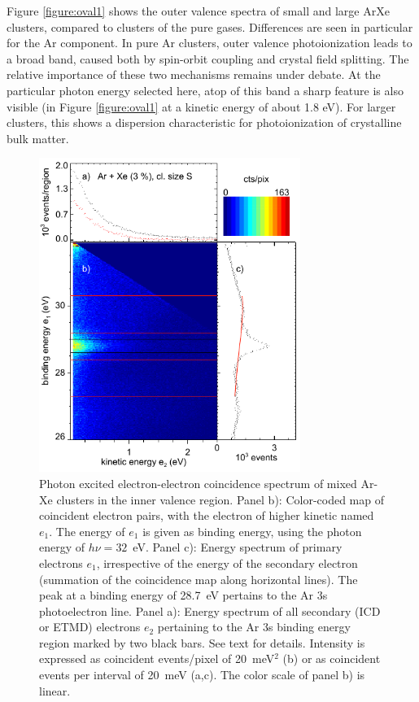 Figure \ref{figure:oval1} shows the outer valence spectra of small and large ArXe clusters, compared to clusters of the pure gases. Differences are seen in particular for the Ar component. In pure Ar clusters, outer valence photoionization leads to a broad band, caused both by spin-orbit coupling and crystal field splitting. The relative importance of these two mechanisms remains under debate.\cite{hergenhahnprb,rolles} At the particular photon energy selected here, atop of this band a sharp feature is also visible (in Figure \ref{figure:oval1} at a kinetic energy of about 1.8 eV). For larger clusters, this shows a dispersion characteristic for photoionization of crystalline bulk matter.\cite{foerstel_arg1_2010,foerstel_arg2_2011} 



\begin{figure}[ht]
 \centering
 \includegraphics[width=8.5cm]{pics/figure_map.pdf}
 \caption{
Photon excited electron-electron coincidence spectrum of mixed Ar-Xe clusters in the inner valence region. Panel b): Color-coded map of coincident electron pairs, with the electron of higher kinetic named $e_1$. The energy of $e_1$ is given as binding energy, using the photon energy of $h\nu = 32$~eV. Panel c): Energy spectrum of primary electrons $e_1$, irrespective of the energy of the secondary electron (summation of the coincidence map along horizontal lines). The peak at a binding energy of 28.7~eV pertains to the Ar 3s photoelectron line.  Panel a): Energy spectrum of all secondary (ICD or ETMD) electrons $e_2$ pertaining to the Ar 3s binding energy region marked by two black bars. See text for details. Intensity is expressed as coincident events/pixel of 20~meV$^2$ (b) or as coincident events per interval of 20~meV (a,c). The color scale of panel b) is linear.
}
 \label{figure:map}
\end{figure}


